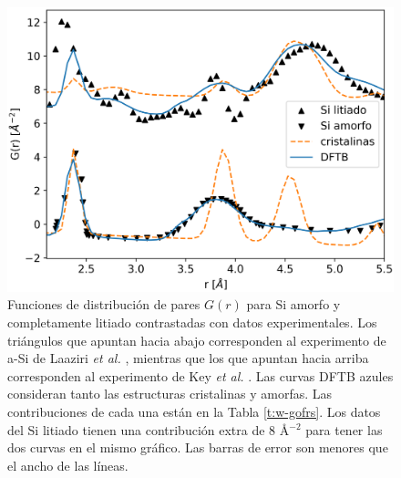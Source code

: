 \begin{figure}[h!]
    \centering
    \includegraphics[width=.7\textwidth]{Silicio/prediccion/resultados/xray/pdfs.png}
    \caption{Funciones de distribución de pares $G(r)$ para Si amorfo y 
    completamente litiado contrastadas con datos experimentales. Los triángulos 
    que apuntan hacia abajo corresponden al experimento de a-Si de Laaziri 
    \textit{et al.} \cite{laaziri1999}, mientras que los que apuntan hacia arriba 
    corresponden al experimento de Key \textit{et al.} \cite{key2011}. Las curvas 
    DFTB azules consideran tanto las estructuras cristalinas y amorfas. Las 
    contribuciones de cada una están en la Tabla  \ref{t:w-gofrs}. Los datos del Si 
    litiado tienen una contribución extra de 8 \AA$^{-2}$ para tener las dos curvas 
    en el mismo gráfico. Las barras de error son menores que el ancho de las líneas.}
    \label{fig:pdfs}
\end{figure}
